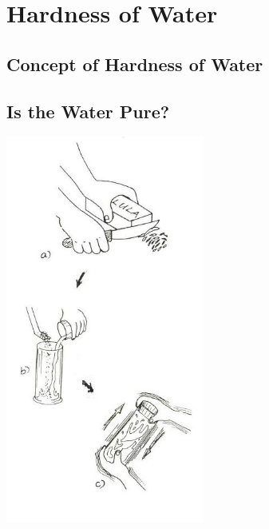 \section{Hardness of Water}  

\begin{multicols}{2}


\section*{Concept of Hardness of Water}


\subsection{Is the Water Pure?}
\label{sub:water-pure}

\begin{center}
\includegraphics[width=0.49\textwidth]{./img/source/hard-water.jpg}
\end{center}


\end{multicols}
